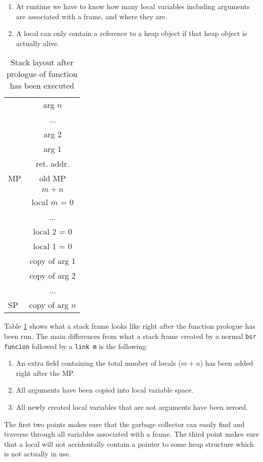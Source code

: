 \documentclass{scrartcl}
\begin{document}
\begin{enumerate}
\item At runtime we have to know how many local variables 
including arguments are 
associated with a frame, and where they are.
\item A local can only contain a reference to a heap object if that
heap object is actually alive.
\end{enumerate}
\begin{table}
\centering
\begin{tabular}{l | c |}
  & arg $n$ \\
\cline{2-2}
  & ... \\
\cline{2-2}
  & arg 2 \\
\cline{2-2}
  & arg 1 \\
\cline{2-2}
  & ret. addr.  \\
\cline{2-2}
MP& old MP \\
\cline{2-2}
  & $m+n$ \\
\cline{2-2}
  & local $m$ = 0 \\
\cline{2-2}
  & ... \\
\cline{2-2}
  & local 2 = 0\\
\cline{2-2}
  & local 1 = 0 \\
\cline{2-2}
  & copy of arg 1 \\
\cline{2-2}
  & copy of arg 2 \\
\cline{2-2}
  & ... \\
\cline{2-2}
SP& copy of arg $n$ 
\end{tabular}
\caption{Stack layout after prologue of function has been executed}
\label{tab:stackframe}
\end{table}
Table \ref{tab:stackframe} shows what a stack frame looks like right
after the function prologue has been run. The main differences from
what a stack frame created by a normal \lstinline{bsr funcion} followed
by a \lstinline{link m} is the following:
\begin{enumerate}
\item An extra field containing the total number of locals ($m+n$)
 has been added right after the MP.
\item All arguments have been copied into local variable space.
\item All newly created local variables that are not arguments have
 been zeroed.
\end{enumerate}
The first two points makes sure that the garbage collector can easily
find and traverse through all variables associated with a frame.
The third point makes sure that a local will not accidentally contain
a pointer to some heap structure which is not actually in use.
\end{document}
